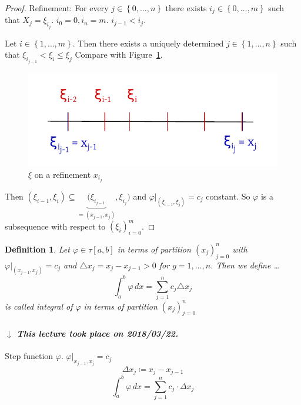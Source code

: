 \documentclass{article}
\newtheorem{definition}{Definition}  \numberwithin{definition}{section}
\newcommand{\set}[1]{\left\{#1\right\}}
\newcommand{\dateref}[1]{%
  \begin{mdframed}[backgroundcolor=gray!10,innerbottommargin=0pt,innertopmargin=0pt]
    \paragraph{\textit{$\downarrow$ This lecture took place on #1.}}%
  \end{mdframed}%
}
\begin{document}
\begin{proof}
  Refinement: For every $j \in \set{0,\dots,n}$ there exists $i_j \in \set{0,\dots,m}$ such that $X_j = \xi_{i_j}$.
  $i_0 = 0, i_n = m$. $i_{j-1} < i_j$.

  Let $i \in \set{1, \dots, m}$. Then there exists a uniquely determined $j \in \set{1, \dots, n}$ such that $\xi_{i_{j-1}} < \xi_i \leq \xi_j$
  Compare with Figure~\ref{img:xi}.

  \begin{figure}[t]
    \begin{center}
      \includegraphics{img/11_xi.pdf}
      \caption{$\xi$ on a refinement $x_{i_j}$}
      \label{img:xi}
    \end{center}
  \end{figure}

  Then $(\xi_{i-1}, \xi_i) \subseteq \underbrace{(\xi_{i_{j-1}}}_{= (x_{j-1}, x_j)}, \xi_{i_j})$ and $\varphi|_{(\xi_{i-1}, \xi_j)} = c_j$ constant. So $\varphi$ is a subsequence with respect to $(\xi_i)_{i=0}^m$.
\end{proof}

\begin{definition}
  Let $\varphi \in \tau[a,b]$ in terms of partition $(x_j)_{j=0}^n$ with $\varphi|_{(x_{j-1}, x_j)} = c_j$ and $\triangle x_j = x_j - x_{j-1} > 0$ for $g = 1,\dots,n$. Then we define \dots
  \[ \int_a^b \varphi \, dx = \sum_{j=1}^n c_j \triangle x_j \]
  is called \emph{integral of $\varphi$} in terms of partition $(x_j)_{j=0}^n$
\end{definition}

\dateref{2018/03/22}

Step function $\varphi$. $\varphi|_{x_{j-1},x_j} = c_j$
\[ \Delta x_j \coloneqq x_j - x_{j-1} \]
\[ \int_a^b \varphi \, dx = \sum_{j=1}^n c_j \cdot \Delta x_j \]
\end{document}
